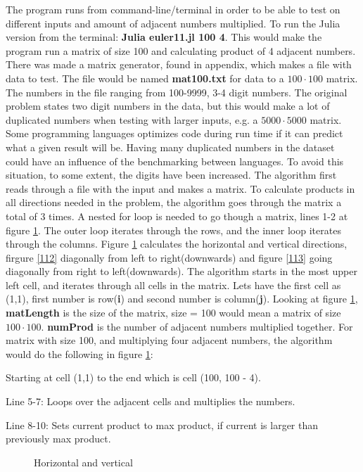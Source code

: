 \documentclass[a4paper,11pt]{article}
\begin{document}
The program runs from command-line/terminal in order to be able to test on different inputs and amount of adjacent numbers multiplied. To run the Julia version from the terminal: \textbf{Julia euler11.jl 100 4}. This would make the program run a matrix of size 100 and calculating product of 4 adjacent numbers. There was made a matrix generator, found in appendix, which makes a file with data to test. The file would be named \textbf{mat100.txt} for data to a $100 \cdot 100$ matrix. The numbers in the file ranging from 100-9999, 3-4 digit numbers. The original problem states two digit numbers in the data, but this would make a lot of duplicated numbers when testing with larger inputs, e.g. a $5000 \cdot 5000$ matrix. Some programming languages optimizes code during run time if it can predict what a given result will be. Having many duplicated numbers in the dataset could have an influence of the benchmarking between languages. To avoid this situation, to some extent, the digits have been increased. The algorithm first reads through a file with the input and makes a matrix. To calculate products in all directions needed in the problem, the algorithm goes through the matrix a total of 3 times. A nested for loop is needed to go though a matrix, lines 1-2 at figure \ref{111}. The outer loop iterates through the rows, and the inner loop iterates through the columns. Figure \ref{111} calculates the horizontal and vertical directions, firgure \ref{112} diagonally from left to right(downwards) and figure \ref{113} going diagonally from right to left(downwards). The algorithm starts in the most upper left cell, and iterates through all cells in the matrix. Lets have the first cell as (1,1), first number is row(\textbf{i}) and second number is column(\textbf{j}). Looking at figure \ref{111}, \textbf{matLength} is the size of the matrix, size = 100 would mean a matrix of size $100 \cdot 100$. \textbf{numProd} is the number of adjacent numbers multiplied together. For matrix with size 100, and multiplying four adjacent numbers, the algorithm would do the following in figure \ref{111}: 
\begin{list}{}{}
	\item Starting at cell (1,1) to the end which is cell (100, 100 - 4).
	\item Line 5-7: Loops over the adjacent cells and multiplies the numbers.
	\item Line 8-10: Sets current product to max product, if current is larger than previously max product.
\end{list}
\begin{figure}[H]
	\begin{center}
		
		\caption{Horizontal and vertical}
		\label{111}
	\end{center}
\end{figure}
\end{document}
